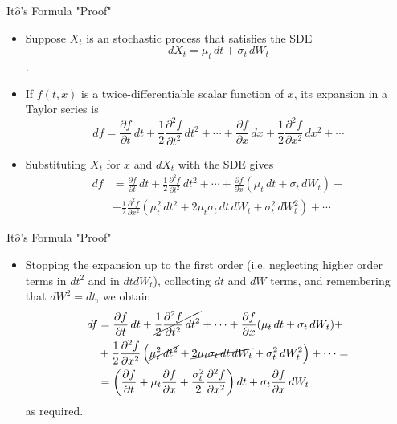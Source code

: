 \documentclass{beamer}
\begin{document}
\begin{frame}{It$\hat{o}$'s Formula "Proof"}
	\begin{itemize}
	\item Suppose $X_t$ is an stochastic process that satisfies the SDE
	\begin{equation*}	
	dX_{t}=\mu _{t}\,dt+\sigma _{t}\,dW_{t}
	\end{equation*}.
	\item If $f(t,x)$ is a twice-differentiable scalar function of $x$, its expansion in a Taylor series is
	\begin{equation*}
	df={\frac {\partial f}{\partial t}}\,dt+{\frac {1}{2}}{\frac {\partial ^{2}f}{\partial t^{2}}}\,dt^{2}+\cdots +{\frac {\partial f}{\partial x}}\,dx+{\frac {1}{2}}{\frac {\partial ^{2}f}{\partial x^{2}}}\,dx^{2}+\cdots
	\end{equation*}
	\item Substituting $X_t$ for $x$ and $dX_t$ with the SDE gives
	\begin{equation*}
		\begin{aligned}
		df&={\frac {\partial f}{\partial t}}\,dt+{\frac {1}{2}}{\frac {\partial ^{2}f}{\partial t^{2}}}\,dt^{2}+\cdots +{\frac {\partial f}{\partial x}}(\mu _{t}\,dt+\sigma _{t}\,dW_{t})+\\
		&+{\frac {1}{2}}{\frac {\partial ^{2}f}{\partial x^{2}}}\left(\mu _{t}^{2}\,dt^{2}+2\mu _{t}\sigma _{t}\,dt\,dW_{t}+\sigma _{t}^{2}\,dW_{t}^{2}\right)+\cdots
		\end{aligned}
	\end{equation*}
\end{itemize}
\end{frame}

\begin{frame}{It$\hat{o}$'s Formula "Proof"}
	\begin{itemize}
	\item Stopping the expansion up to the first order (i.e. neglecting higher order terms in $dt^2$ and in $dt dW_t$), collecting $dt$ and $dW$ terms, and remembering that $dW^2=dt$, we obtain
	\begin{equation*}
		\begin{aligned}
			df&={\frac {\partial f}{\partial t}}\,dt+\cancel{{\frac {1}{2}}{\frac {\partial ^{2}f}{\partial t^{2}}}\,dt^{2}}+\cdots +{\frac {\partial f}{\partial x}}(\mu _{t}\,dt+\sigma _{t}\,dW_{t})+\\
			&+{\frac {1}{2}}{\frac {\partial ^{2}f}{\partial x^{2}}}\left(\cancel{\mu _{t}^{2}\,dt^{2}}+\cancel{2\mu _{t}\sigma _{t}\,dt\,dW_{t}}+\sigma _{t}^{2}\,dW_{t}^{2}\right)+\cdots =\\
			&=\left({\frac {\partial f}{\partial t}}+\mu _{t}{\frac {\partial f}{\partial x}}+{\frac {\sigma _{t}^{2}}{2}}{\frac {\partial ^{2}f}{\partial x^{2}}}\right)dt+\sigma _{t}{\frac {\partial f}{\partial x}}\,dW_{t}
		\end{aligned}
	\end{equation*}
	as required.
	
\end{itemize}
\end{frame}
\end{document}
